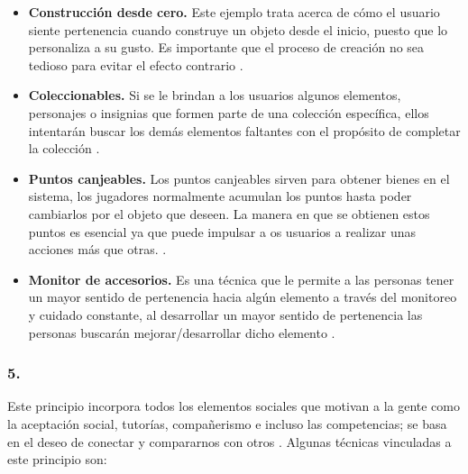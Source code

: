     \begin{itemize}
    \item
    {\bf Construcción desde cero.}
        Este ejemplo trata acerca de cómo el usuario siente pertenencia cuando
        construye un objeto desde el inicio, puesto que lo personaliza a su gusto.
        Es importante que el proceso de creación no sea tedioso para evitar el
        efecto contrario \cite[p. 182]{Octalysis}.

    \item
    {\bf Coleccionables.}
        Si se le brindan a los usuarios algunos elementos, personajes o insignias que
        formen parte de una colección específica, ellos intentarán buscar los demás
        elementos faltantes con el propósito de completar la colección
        \cite[p. 183]{Octalysis}.

    \item
    {\bf Puntos canjeables.}
        Los puntos canjeables sirven para obtener bienes en el sistema, los jugadores
        normalmente acumulan los puntos hasta poder cambiarlos por el objeto que
        deseen. La manera en que se obtienen estos puntos es esencial ya que puede
        impulsar a os usuarios a realizar unas acciones más que otras.
        \cite[p. 187]{Octalysis}.

    \item
    {\bf Monitor de accesorios.}
        Es una técnica que le permite a las personas tener un mayor sentido de pertenencia
        hacia algún elemento a través del monitoreo y cuidado constante, al desarrollar un
        mayor sentido de pertenencia las personas buscarán mejorar/desarrollar dicho elemento
        \cite[p. 189]{Octalysis}.

    \end{itemize}

\subsubsection{5. \principioV} \label{subsec:principioV}

 Este principio incorpora todos los elementos sociales que motivan a la gente como la
 aceptación social, tutorías, compañerismo e incluso las competencias; se basa en el
 deseo de conectar y compararnos con otros \cite[pp. 27, 197]{Octalysis}. Algunas
 técnicas vinculadas a este principio son:

